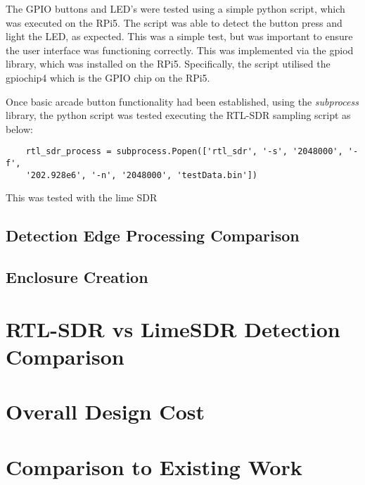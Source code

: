 The GPIO buttons and LED's were tested using a simple python script, which was executed on the RPi5. The script was able to detect the button press and light the LED, as expected. This was a simple test, but was important to ensure the user interface was functioning correctly.   This was implemented via the gpiod library, which was installed on the RPi5. Specifically, the script utilised the gpiochip4 which is the GPIO chip on the RPi5. 

\par \vspace{0.5cm}
\noindent
Once basic arcade button functionality had been established, using the \textit{subprocess} library, the python script was tested executing the RTL-SDR sampling script as below:

\begin{verbatim}
    rtl_sdr_process = subprocess.Popen(['rtl_sdr', '-s', '2048000', '-f', 
    '202.928e6', '-n', '2048000', 'testData.bin'])
\end{verbatim}

\noindent This was tested with the lime SDR


\subsection{Detection Edge Processing Comparison} \label{sec:edgeProcessing}

\subsection{Enclosure Creation} \label{sec:enclosureResults}

\section{RTL-SDR vs LimeSDR Detection Comparison \label{sec:SDRcomparison}}

\section{Overall Design Cost}

\section{Comparison to Existing Work}
